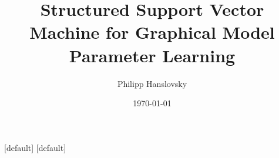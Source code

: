 




\title{Structured Support Vector Machine for Graphical Model Parameter Learning}

\author{Philipp Hanslovsky}
\date{\today}

[default]
[default]



\maketitle





\appendix %
\setcounter{finalframe}{\value{framenumber}}

% 

\setcounter{framenumber}{\value{finalframe}}





